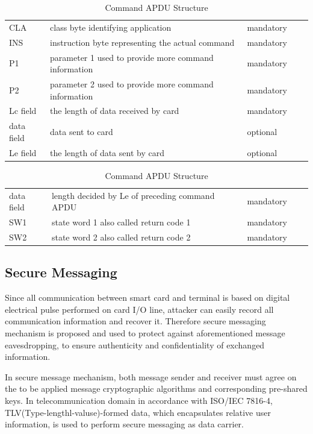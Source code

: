 \begin{table}[!htbp]
\caption{Command APDU Structure}
\centering
\begin{tabular}{lllll}
\hline\hline
 CLA &class byte identifying application  & mandatory \\[0.5ex]
 INS &instruction byte representing the actual command  & mandatory \\
 P1 &parameter 1 used to provide more command information & mandatory \\
 P2 &parameter 2 used to provide more command information& mandatory \\
 Lc field &the length of data received by card & mandatory \\
 data field &data sent to card& optional \\
Le field &the length of data sent by card& optional \\
\hline
\end{tabular}
\label{table:capdu}
\end{table}

\begin{table}[ht]
\caption{Command APDU Structure}
\centering
\begin{tabular}{lllll}
\hline\hline
 data field & length decided by Le of preceding command  APDU  & mandatory \\[0.5ex]
 SW1 &state word 1 also called return code 1  & mandatory \\
 SW2 &state word 2 also called return code 2& mandatory \\
\hline
\end{tabular}
\label{table:rapdu}
\end{table}

\subsection{Secure Messaging}
Since all communication between smart card and terminal is based on digital electrical pulse performed on card I/O line, attacker can easily record all communication information and recover it. Therefore secure messaging mechanism is proposed and used to protect against aforementioned message eavesdropping, to ensure authenticity and confidentiality of exchanged information.

In secure message mechanism, both message sender and receiver must agree on the to be applied message cryptographic algorithms and corresponding pre-shared keys. In telecommunication domain in accordance with ISO/IEC 7816-4\cite{handbuch}, TLV(Type-lengthl-valuse)-formed data, which encapsulates relative user information, is used to perform secure messaging as data carrier.


